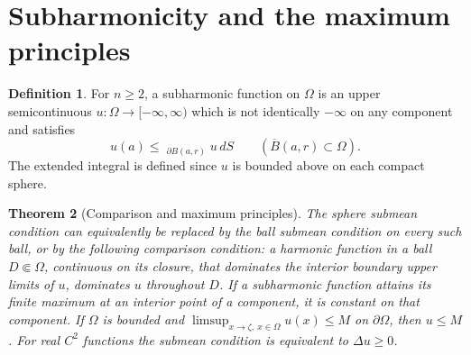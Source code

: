\documentclass[11pt,oneside,openany]{book}
\newcommand{\dashint}{\mathop{\overline{\int}}\nolimits}
\theoremstyle{plain}
\newtheorem{theorem}{Theorem}[chapter]
\theoremstyle{definition}
\newtheorem{definition}[theorem]{Definition}
\theoremstyle{remark}
\begin{document}
\section{Subharmonicity and the maximum principles}
\label{pde:L04}

\begin{definition}
For \(n\ge2\), a subharmonic function on \(\Omega\) is an upper
semicontinuous \(u:\Omega\to[-\infty,\infty)\) which is not
identically \(-\infty\) on any component and satisfies
\[
 u(a)\le \dashint_{\partial B(a,r)}u\,dS
 \qquad(\overline B(a,r)\subset\Omega).
\]
The extended integral is defined since \(u\) is bounded above
on each compact sphere.
\end{definition}

\begin{theorem}[Comparison and maximum principles]
\label{thm:pde-subharmonic-comparison}
The sphere submean condition can equivalently be replaced by
the ball submean condition on every such ball, or by the
following comparison condition: a harmonic function in a ball
\(D\Subset\Omega\), continuous on its closure, that dominates
the interior boundary upper limits of \(u\), dominates \(u\)
throughout \(D\).
If a subharmonic function attains its finite maximum at an
interior point of a component, it is constant on that component.
If \(\Omega\) is bounded and
\(\limsup_{x\to\zeta,\ x\in\Omega}u(x)\le M\) on \(\partial\Omega\),
then \(u\le M\). For real \(C^2\) functions the submean condition
is equivalent to \(\Delta u\ge0\).
\end{theorem}
\end{document}
